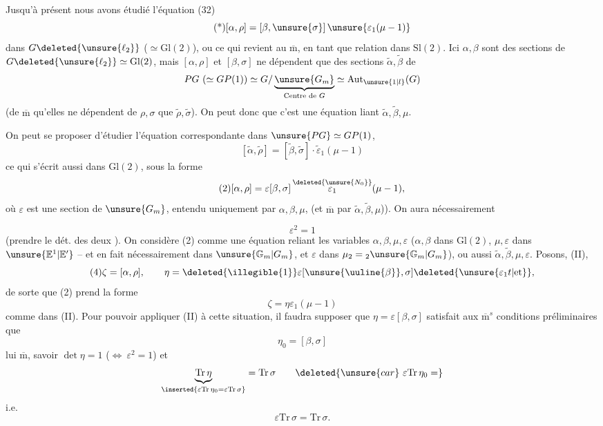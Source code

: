 Jusqu'à présent nous avons étudié l'équation (32)
\[
\tag{*}
[\alpha,\rho]=[\beta,\unsure{\sigma}]\,
\unsure{\varepsilon_1(\mu-1)}
\]
dans $G\deleted{\unsure{\ell_2}}$ ($\simeq\mathrm{Gl}(2)$), ou ce qui revient au
$\overline{\mathrm m}$,  en tant que relation dans $\mathrm{Sl}(2)$.
Ici $\alpha,\beta$ sont des sections  de
$G\deleted{\unsure{\ell_2}}\simeq\mathrm{Gl}(2)$, mais $[\alpha,\rho]$ et
$[\beta,\sigma]$ ne dépendent que des sections 
$\widetilde\alpha,\widetilde\beta$ de
\[
PG\ (\simeq GP(1))\simeq
G/\underbrace{\unsure{G_m}}_{\text{Centre de }G}
\simeq\mathrm{Aut}_{\unsure{1|l}}(G)
\]
(de $\overline{\mathrm m}$ qu'elles ne dépendent de $\rho,\sigma$ que
 $\widetilde\rho,\widetilde\sigma$).
On peut donc  que c'est une équation
liant $\widetilde\alpha,\widetilde\beta,\mu$.

On peut se proposer d'étudier l'équation correspondante dans
$\unsure{PG}\simeq GP(1)$,
\[
\tag{1}
[\widetilde\alpha,\widetilde\rho]
 =[\widetilde\beta,\widetilde\sigma]\cdot\widetilde\varepsilon_1(\mu-1)
\]
ce qui s'écrit aussi dans $\mathrm{Gl}(2)$, sous la forme 
\[
\tag{2}
[\alpha,\rho]=\varepsilon[\beta,\sigma]\,
\overset{\deleted{\unsure{N_0}}}{\varepsilon_1}(\mu-1),
\]
où $\varepsilon$ est une section de $\unsure{G_m}$,
  entendu uniquement
 par $\alpha,\beta,\mu$,
(et $\overline{\mathrm m}$ par $\widetilde\alpha,\widetilde\beta,\mu$)).
On aura nécessairement


\[
\tag{3}
\varepsilon^2=1
\]
(prendre le dét. des deux ). On considère (2) comme une équation
reliant les variables $\alpha,\beta,\mu,\varepsilon$
($\alpha,\beta$ dans $\mathrm{Gl}(2)$, $\mu,\varepsilon$ dans
$\unsure{\mathbb E^1|\mathbb E'}$ -- et en fait nécessairement dans
$\unsure{\mathbb G_m|G_m}$, et $\varepsilon$  dans
$\mu_2={}_2\unsure{\mathbb G_m|G_m}$), ou aussi
$\widetilde\alpha,\widetilde\beta,\mu,\varepsilon$.
Posons,  (II),
\[
\tag{4}
\zeta=[\alpha,\rho],\qquad
\eta=\deleted{\illegible{1}}\varepsilon
[\unsure{\uuline{\beta}},\sigma]\deleted{\unsure{\varepsilon_1 t|\text{et}}},
\]
de sorte que (2) prend la forme
\[
\tag{5}
\zeta=\eta\varepsilon_1(\mu-1)
\]
comme dans (II). Pour pouvoir appliquer (II) à cette situation, il faudra
supposer que $\eta=\varepsilon[\beta,\sigma]$ satisfait aux
$\overline{\mathrm m}^{s}$ conditions préliminaires que
\[
\eta_0=[\beta,\sigma]
\]
lui $\overline{\mathrm m}$, savoir $\det\eta=1$
($\Longleftrightarrow\ \varepsilon^2=1$) et
\[
\underbrace{\mathrm{Tr}\,\eta}_{\inserted{\varepsilon\mathrm{Tr}\,\eta_0
=\varepsilon\mathrm{Tr}\,\sigma}}
=\mathrm{Tr}\,\sigma
\qquad\deleted{\unsure{car}\ \varepsilon\mathrm{Tr}\,\eta_0=}
\]
i.e.
\[
\varepsilon\mathrm{Tr}\,\sigma=\mathrm{Tr}\,\sigma.
\]

